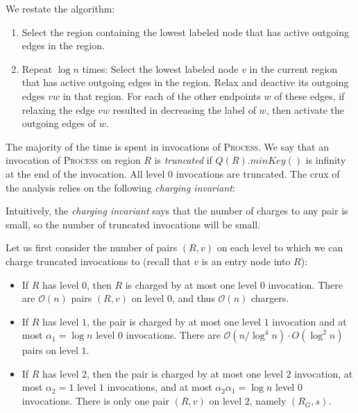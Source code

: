 \documentclass[11pt]{article}
\begin{document}
We restate the algorithm:
\begin{enumerate}
\item Select the region containing the lowest labeled node that has active outgoing edges in the region.
\item Repeat $\log n$ times: Select the lowest labeled node $v$ in the current region that has active outgoing edges in the region. Relax and deactive its outgoing edges $vw$ in that region. For each of the other endpoints $w$ of these edges, if relaxing the edge $vw$ resulted in decreasing the label of $w$, then activate the outgoing edges of $w$.
\end{enumerate}

The majority of the time is spent in invocations of \textsc{Process}. We say that an invocation of \textsc{Process} on region $R$ is \emph{truncated} if $Q(R).minKey()$ is infinity at the end of the invocation. All level $0$ invocations are truncated. The crux of the analysis relies on the following \emph{charging invariant}:

\noindent{}

Intuitively, the \emph{charging invariant} says that the number of charges to any pair is small, so the number of truncated invocations will be small.

 Let us first consider the number of pairs $(R,v)$ on each level to which we can charge truncated invocations to (recall that $v$ is an entry node into $R$):
\begin{itemize}
\item If $R$ has level $0$, then $R$ is charged by at most one level $0$ invocation. There are $\mathcal{O}(n)$ pairs $(R,v)$ on level $0$, and thus $\mathcal{O}(n)$ chargers.
\item If $R$ has level $1$, the pair is charged by at most one level $1$ invocation and at most $\alpha_1 = \log n$ level $0$ invocations. There are $\mathcal{O}(n/\log^4n)\cdot O(\log^2 n)$ pairs on level $1$.
\item If $R$ has level $2$, then the pair is charged by at most one level $2$ invocation, at most $\alpha_2 = 1$ level $1$ invocations, and at most $\alpha_2\alpha_1 = \log n$ level $0$ invocations. There is only one pair $(R,v)$ on level $2$, namely $(R_G,s)$.
\end{itemize}
\end{document}
